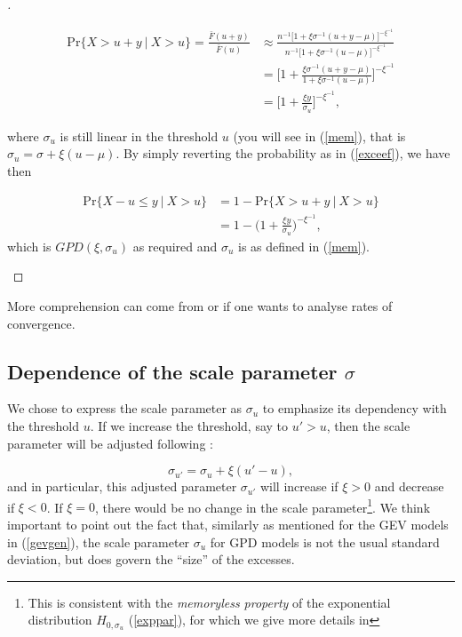\begin{proof}[\nopunct ]
\begin{itemize}
		
		\begin{equation*}
		\begin{aligned}
		\text{Pr}\{X>u+y\ | \ X>u\}
		= \frac{\bar{F}(u+y)}{\bar{F}(u)} 
		& \approx\frac{n^{-1}\big[1+\xi\sigma^{-1}(u+y-\mu)\big]^{-\xi^{-1}}}{n^{-1}\big[1+\xi\sigma^{-1}(u-\mu)\big]^{-\xi^{-1}}} \\  
		& = \bigg[1+\frac{\xi\sigma^{-1}(u+y-\mu)}{1+\xi\sigma^{-1}(u-\mu)}\bigg]^{-\xi^{-1}} \\
		& = \bigg[1+\frac{\xi y}{\sigma_u}\bigg]^{-\xi^{-1}},
		\end{aligned}
		\end{equation*}
		
		where $\sigma_u$ is still linear in the threshold $u$ (you will see in (\ref{mem}), that is $\sigma_u=\sigma+\xi(u-\mu)$. By simply reverting the probability  as in (\ref{exceef}), we have then 
		
		\begin{equation}
		\begin{aligned}
		\text{Pr}\{X-u\leq y\ | \ X>u\} & =1-\text{Pr}\{X>u+y\ | \ X>u\} \\
		& = 1-\bigg(1+\frac{\xi y}{\sigma_u}\bigg)^{-\xi^{-1}},
		\end{aligned}
		\end{equation}
		which is $GPD(\xi,\sigma_u)$ as required and $\sigma_u$ is as defined in 
		(\ref{mem}).
	\end{itemize}
\end{proof}
More comprehension can come from \cite[pp.27-28]{reiss_statistical_2007} or if one wants to 
analyse rates of convergence.


\subsection{Dependence of the scale parameter $\sigma$} We chose to express the scale parameter as $\sigma_u$ to emphasize its dependency with the threshold $u$. If we increase the threshold, say to $u'>u$, then the scale parameter will be adjusted following :

\begin{equation} \label{mem}
\sigma_{u'}=\sigma_u+\xi (u'-u),
\end{equation}
and in particular, this adjusted parameter $\sigma_{u'}$ will increase if $\xi>0$ and decrease if $\xi<0$.
If $\xi =0$, there would be no change in the scale parameter\footnote{This is consistent with the \emph{memoryless property} of the exponential distribution $H_{0,\sigma_u}$ (\ref{exppar}), for which we give more details in}. 
We think important to point out the fact that, similarly as mentioned for the GEV models in (\ref{gevgen}), the scale parameter $\sigma_u$ for GPD models
is not the usual standard deviation, but does govern the “size” of the excesses. \cite[pp.20]{AghaKouchak_extremes_2013}


